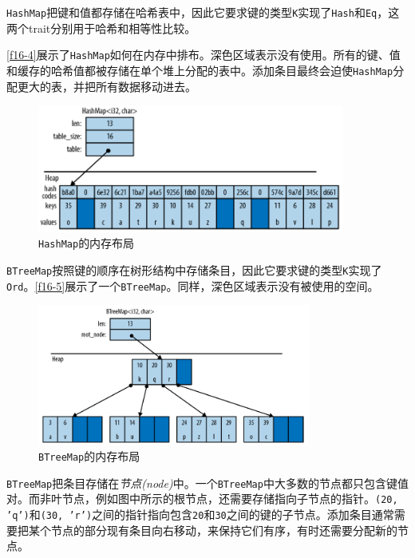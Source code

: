 \texttt{HashMap}把键和值都存储在哈希表中，因此它要求键的类型\texttt{K}实现了\texttt{Hash}和\texttt{Eq}，这两个trait分别用于哈希和相等性比较。

\autoref{f16-4}展示了\texttt{HashMap}如何在内存中排布。深色区域表示没有使用。所有的键、值和缓存的哈希值都被存储在单个堆上分配的表中。添加条目最终会迫使\texttt{HashMap}分配更大的表，并把所有数据移动进去。

\begin{figure}[htbp]
    \centering
    \includegraphics[width=0.9\textwidth]{../img/f16-4.png}
    \caption{\texttt{HashMap}的内存布局}
    \label{f16-4}
\end{figure}

\texttt{BTreeMap}按照键的顺序在树形结构中存储条目，因此它要求键的类型\texttt{K}实现了\texttt{Ord}。\autoref{f16-5}展示了一个\texttt{BTreeMap}。同样，深色区域表示没有被使用的空间。

\begin{figure}[htbp]
    \centering
    \includegraphics[width=0.8\textwidth]{../img/f16-5.png}
    \caption{\texttt{BTreeMap}的内存布局}
    \label{f16-5}
\end{figure}

\texttt{BTreeMap}把条目存储在\emph{节点(node)}中。一个\texttt{BTreeMap}中大多数的节点都只包含键值对。而非叶节点，例如图中所示的根节点，还需要存储指向子节点的指针。\texttt{(20, 'q')}和\texttt{(30, 'r')}之间的指针指向包含\texttt{20}和\texttt{30}之间的键的子节点。添加条目通常需要把某个节点的部分现有条目向右移动，来保持它们有序，有时还需要分配新的节点。

